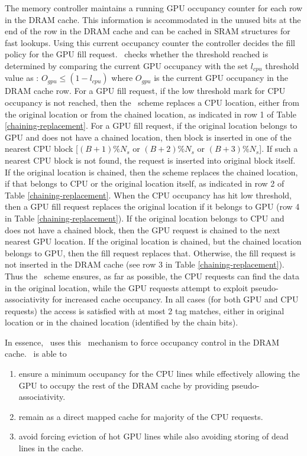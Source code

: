 \par The memory controller maintains a running GPU occupancy counter for each row in the DRAM cache. This information is accommodated in the unused bits at the end of the row in the DRAM cache and can be cached in SRAM structures for fast lookups. Using this current occupancy counter the controller decides the fill policy for the GPU fill request. \cachename\ checks whether the threshold reached is determined by comparing the current GPU occupancy with the set \textit{$l_{cpu}$} threshold value as : $O_{gpu}\le(1-l_{cpu})$ where $O_{gpu}$ is the current GPU occupancy in the DRAM cache row. For a GPU fill request, if the low threshold mark for CPU occupancy is not reached, then the \chaining\ scheme replaces a CPU location, either from the original location or from the chained location, as indicated in row 1 of Table \ref{chaining-replacement}. For a GPU fill request, if the original location belongs to GPU and does not have a chained location, then block is inserted in one of the nearest CPU block [$(B+1)\%N_s$ or $(B+2)\%N_s$ or $(B+3)\%N_s$]. If such a nearest CPU block is not found, the request is inserted into original block itself. If the original location is chained, then the scheme replaces the chained location, if that belongs to CPU or the original location itself, as indicated in row 2 of Table \ref{chaining-replacement}. When the CPU occupancy has hit low threshold, then a GPU fill request replaces the original location if it belongs to GPU (row 4 in Table \ref{chaining-replacement}). If the original location belongs to CPU and does not have a chained block, then the GPU request is chained to the next nearest GPU location. If the original location is chained, but the chained location belongs to GPU, then the fill request replaces that. Otherwise, the fill request is not inserted in the DRAM cache (see row 3 in Table \ref{chaining-replacement}). Thus the \chaining\ scheme ensures, as far as possible, the CPU requests can find the data in the original location, while the GPU requests attempt to exploit pseudo-associativity for increased cache occupancy. In all cases (for both GPU and CPU requests) the access is satisfied with at most 2 tag matches, either in original location or in the chained location (identified by the chain bits). 

\par In essence, \cachename\ uses this \chaining\ mechanism to force occupancy control in the DRAM cache. \chaining\ is able to 
\begin{enumerate}[label=(\roman*)]
	\item ensure a minimum occupancy for the CPU lines while effectively allowing the GPU to occupy the rest of the DRAM cache by providing pseudo-associativity.
	\item remain as a direct mapped cache for majority of the CPU requests.
	\item avoid forcing eviction of hot GPU lines while also avoiding storing of dead lines in the cache.
\end{enumerate}


